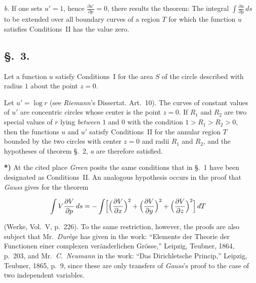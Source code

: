\documentclass{article}
\begin{document}
\emph{b.} If one sets $u' = 1$, hence $\frac{\partial u'}{\partial p} = 0$, there results the theorem: The integral $\displaystyle\int \frac{\partial u}{\partial p}\,ds$ to be extended over all boundary curves of a region $T$ for which the function $u$ satisfies Conditions~II has the value zero.



\subsection*{§.~3.}



Let a function $u$ satisfy Conditions~I for the area $S$ of the circle described with radius $1$ about the point $z = 0$.



Let $u' = \log r$ (see \emph{Riemann}'s Dissertat. Art.~10). The curves of constant values of $u'$ are concentric circles whose center is the point $z = 0$. If $R_1$ and $R_2$ are two special values of $r$ lying \emph{between} $1$ and $0$ with the condition $1 > R_1 > R_2 > 0$, then the functions $u$ and $u'$ satisfy Conditions~II for the annular region $T$ bounded by the two circles with center $z = 0$ and radii $R_1$ and $R_2$, and the hypotheses of theorem §.~2, \emph{a} are therefore satisfied.







\textbf{*)} At the cited place \emph{Green} posits the same conditions that in §.~1 have been designated as Conditions~II. An analogous hypothesis occurs in the proof that \emph{Gauss} gives for the theorem

\[

\int V \frac{\partial V}{\partial p}\,ds = -\int \Bigl[\Bigl(\frac{\partial V}{\partial x}\Bigr)^2 + \Bigl(\frac{\partial V}{\partial y}\Bigr)^2 + \Bigl(\frac{\partial V}{\partial z}\Bigr)^2\Bigr]\,dT

\]

(Werke, Vol.~V, p.~226). To the same restriction, however, the proofs are also subject that Mr.~\emph{Durège} has given in the work: ``Elemente der Theorie der Functionen einer complexen veränderlichen Grösse,'' Leipzig, Teubner, 1864, p.~203, and Mr.~\emph{C.~Neumann} in the work: ``Das Dirichletsche Princip,'' Leipzig, Teubner, 1865, p.~9, since these are only transfers of \emph{Gauss}'s proof to the case of two independent variables.
\end{document}
